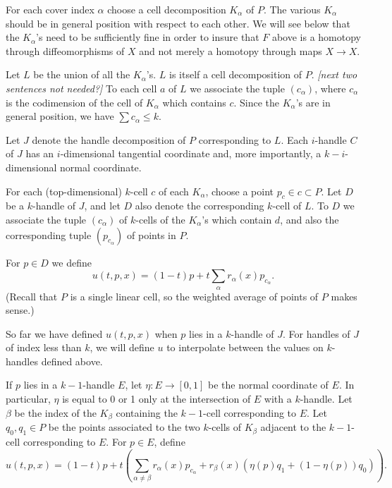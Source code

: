 \documentclass[11pt,leqno]{amsart}
\def\sub{\subset}
\def\nn#1{{{\it \small [#1]}}}
\newcommand{\eq}[1]{\begin{displaymath}#1\end{displaymath}}
\begin{document}
For each cover index $\alpha$ choose a cell decomposition $K_\alpha$ of $P$.
The various $K_\alpha$ should be in general position with respect to each other.
We will see below that the $K_\alpha$'s need to be sufficiently fine in order
to insure that $F$ above is a homotopy through diffeomorphisms of $X$ and not
merely a homotopy through maps $X\to X$.

Let $L$ be the union of all the $K_\alpha$'s.
$L$ is itself a cell decomposition of $P$.
\nn{next two sentences not needed?}
To each cell $a$ of $L$ we associate the tuple $(c_\alpha)$,
where $c_\alpha$ is the codimension of the cell of $K_\alpha$ which contains $c$.
Since the $K_\alpha$'s are in general position, we have $\sum c_\alpha \le k$.

Let $J$ denote the handle decomposition of $P$ corresponding to $L$.
Each $i$-handle $C$ of $J$ has an $i$-dimensional tangential coordinate and,
more importantly, a $k{-}i$-dimensional normal coordinate.

For each (top-dimensional) $k$-cell $c$ of each $K_\alpha$, choose a point $p_c \in c \sub P$.
Let $D$ be a $k$-handle of $J$, and let $D$ also denote the corresponding
$k$-cell of $L$.
To $D$ we associate the tuple $(c_\alpha)$ of $k$-cells of the $K_\alpha$'s
which contain $d$, and also the corresponding tuple $(p_{c_\alpha})$ of points in $P$.

For $p \in D$ we define
\eq{
    u(t, p, x) = (1-t)p + t \sum_\alpha r_\alpha(x) p_{c_\alpha} .
}
(Recall that $P$ is a single linear cell, so the weighted average of points of $P$
makes sense.)

So far we have defined $u(t, p, x)$ when $p$ lies in a $k$-handle of $J$.
For handles of $J$ of index less than $k$, we will define $u$ to
interpolate between the values on $k$-handles defined above.

If $p$ lies in a $k{-}1$-handle $E$, let $\eta : E \to [0,1]$ be the normal coordinate
of $E$.
In particular, $\eta$ is equal to 0 or 1 only at the intersection of $E$
with a $k$-handle.
Let $\beta$ be the index of the $K_\beta$ containing the $k{-}1$-cell
corresponding to $E$.
Let $q_0, q_1 \in P$ be the points associated to the two $k$-cells of $K_\beta$
adjacent to the $k{-}1$-cell corresponding to $E$.
For $p \in E$, define
\eq{
    u(t, p, x) = (1-t)p + t \left( \sum_{\alpha \ne \beta} r_\alpha(x) p_{c_\alpha}
            + r_\beta(x) (\eta(p) q_1 + (1-\eta(p)) q_0) \right) .
}
\end{document}
